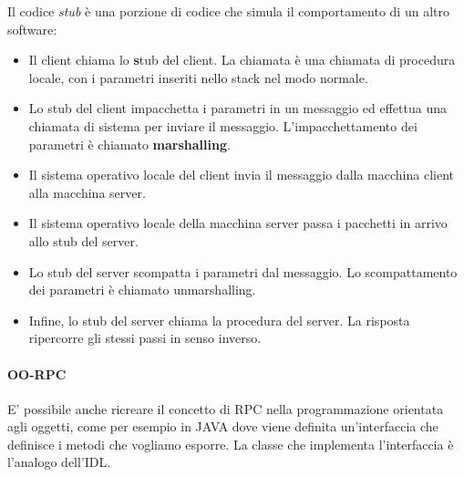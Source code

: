 \documentclass{article}
\providecommand{\tightlist}{%
		  \setlength{\itemsep}{0pt}\setlength{\parskip}{0pt}}
\begin{document}
		Il codice \emph{stub} è una porzione di codice che simula il comportamento di un altro software:
		\begin{itemize}
		\tightlist
			\item Il client chiama lo \textbf{s}tub del client. La chiamata è una chiamata di procedura locale, con i parametri inseriti nello stack nel modo normale.
			\item Lo stub del client impacchetta i parametri in un messaggio ed effettua una chiamata di sistema per inviare il messaggio. L'impacchettamento dei parametri è chiamato \textbf{marshalling}.
			\item Il sistema operativo locale del client invia il messaggio dalla macchina client alla macchina server.
			\item Il sistema operativo locale della macchina server passa i pacchetti in arrivo allo stub del server.
			\item Lo stub del server scompatta i parametri dal messaggio. Lo scompattamento dei parametri è chiamato unmarshalling.
			\item Infine, lo stub del server chiama la procedura del server. La risposta ripercorre gli stessi passi in senso inverso.
		\end{itemize}
		
		\paragraph{OO-RPC}
		E' possibile anche ricreare il concetto di RPC nella programmazione orientata agli oggetti, come per esempio in JAVA dove viene definita un'interfaccia che definisce i metodi che vogliamo esporre. La classe che implementa l'interfaccia è l'analogo dell'IDL. 
		
\end{document}
